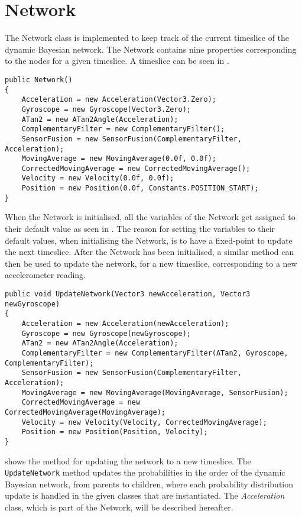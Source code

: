 \section{Network}
The Network class is implemented to keep track of the current timeslice of the dynamic Bayesian network. 
The Network contains nine properties corresponding to the nodes for a given timeslice.
A timeslice can be seen in .

\begin{lstlisting}[caption={Constructor for Network}, label=lst:network-constructor, float=h, style=sharpc]
public Network()
{
	Acceleration = new Acceleration(Vector3.Zero);
	Gyroscope = new Gyroscope(Vector3.Zero);
	ATan2 = new ATan2Angle(Acceleration);
	ComplementaryFilter = new ComplementaryFilter();
	SensorFusion = new SensorFusion(ComplementaryFilter, Acceleration);
	MovingAverage = new MovingAverage(0.0f, 0.0f);
	CorrectedMovingAverage = new CorrectedMovingAverage();
	Velocity = new Velocity(0.0f, 0.0f);
	Position = new Position(0.0f, Constants.POSITION_START);
}
\end{lstlisting}

When the Network is initialised, all the variables of the Network get assigned to their default value as seen in .
The reason for setting the variables to their default values, when initialising the Network, is to have a fixed-point to update the next timeslice.
After the Network has been initialised, a similar method can then be used to update the network, for a new timeslice, corresponding to a new accelerometer reading.

\begin{lstlisting}[caption={UpdateNetwork method in Network}, label=lst:network-update-network, float=h, style=sharpc]
public void UpdateNetwork(Vector3 newAcceleration, Vector3 newGyroscope)
{
	Acceleration = new Acceleration(newAcceleration);
	Gyroscope = new Gyroscope(newGyroscope);
	ATan2 = new ATan2Angle(Acceleration);
	ComplementaryFilter = new ComplementaryFilter(ATan2, Gyroscope, ComplementaryFilter);
	SensorFusion = new SensorFusion(ComplementaryFilter, Acceleration);
	MovingAverage = new MovingAverage(MovingAverage, SensorFusion);
	CorrectedMovingAverage = new CorrectedMovingAverage(MovingAverage);
	Velocity = new Velocity(Velocity, CorrectedMovingAverage);
	Position = new Position(Position, Velocity);
}
\end{lstlisting}

 shows the method for updating the network to a new timeslice.
The \lstinline$UpdateNetwork$ method updates the probabilities in the order of the dynamic Bayesian network, from parents to children, where each probability distribution update is handled in the given classes that are instantiated.
The \textit{Acceleration} class, which is part of the Network, will be described hereafter.
